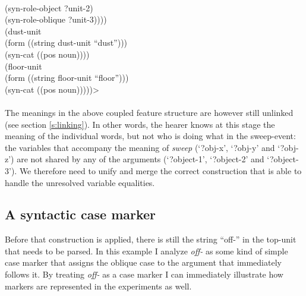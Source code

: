 {{\\ \hspace*{30mm}(syn-role-object ?unit-2)
\\ \hspace*{30mm}(syn-role-oblique ?unit-3))))
\\ \hspace*{2mm}(dust-unit
\\ \hspace*{5mm} (form ((string dust-unit ``dust'')))
\\ \hspace*{5mm} (syn-cat ((pos noun))))
\\ \hspace*{2mm}(floor-unit
\\ \hspace*{5mm} (form ((string floor-unit ``floor'')))
\\ \hspace*{5mm} (syn-cat ((pos noun)))))>}}
\\
\\
The meanings in the above coupled feature structure are however still unlinked (see section \ref{s:linking}). In other words, the hearer knows at this stage the meaning of the individual words, but not who is doing what in the sweep-event: the variables that accompany the meaning of {\em sweep} (`?obj-x', `?obj-y' and `?obj-z') are not shared by any of the arguments (`?object-1', `?object-2' and `?object-3'). We therefore need to unify and merge the correct construction that is able to handle the unresolved variable equalities.

\subsection{A syntactic case marker}
\label{s:morph-rule}

Before that construction is applied, there is still the string ``off-'' in the top-unit that needs to be parsed. In this example I analyze {\em off-} as some kind of simple case marker that assigns the oblique case to the argument that immediately follows it. By treating {\em off-} as a case marker I can immediately illustrate how markers are represented in the experiments as well.

